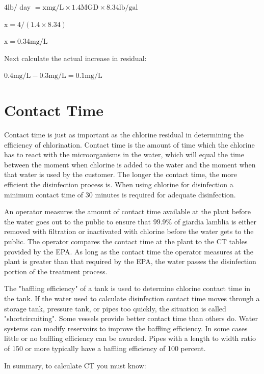 \documentclass[10pt]{article}
\begin{document}
$4 \mathrm{lb} /$ day $=\mathrm{x} \mathrm{mg} / \mathrm{L} \times 1.4 \mathrm{MGD} \times 8.34 \mathrm{lb} / \mathrm{gal}$

$\mathrm{x}=4 /(1.4 \times 8.34)$

$\mathrm{x}=0.34 \mathrm{mg} / \mathrm{L}$

Next calculate the actual increase in residual:

$0.4 \mathrm{mg} / \mathrm{L}-0.3 \mathrm{mg} / \mathrm{L}=0.1 \mathrm{mg} / \mathrm{L}$

\section{Contact Time}
Contact time is just as important as the chlorine residual in determining the efficiency of chlorination. Contact time is the amount of time which the chlorine has to react with the microorganisms in the water, which will equal the time between the moment when chlorine is added to the water and the moment when that water is used by the customer. The longer the contact time, the more efficient the disinfection process is. When using chlorine for disinfection a minimum contact time of 30 minutes is required for adequate disinfection.

An operator measures the amount of contact time available at the plant before the water goes out to the public to ensure that $99.9 \%$ of giardia lamblia is either removed with filtration or inactivated with chlorine before the water gets to the public. The operator compares the contact time at the plant to the CT tables provided by the EPA. As long as the contact time the operator measures at the plant is greater than that required by the EPA, the water passes the disinfection portion of the treatment process.

The "baffling efficiency" of a tank is used to determine chlorine contact time in the tank. If the water used to calculate disinfection contact time moves through a storage tank, pressure tank, or pipes too quickly, the situation is called "shortcircuiting". Some vessels provide better contact time than others do. Water systems can modify reservoirs to improve the baffling efficiency. In some cases little or no baffling efficiency can be awarded. Pipes with a length to width ratio of 150 or more typically have a baffling efficiency of 100 percent.

In summary, to calculate CT you must know:
\end{document}
